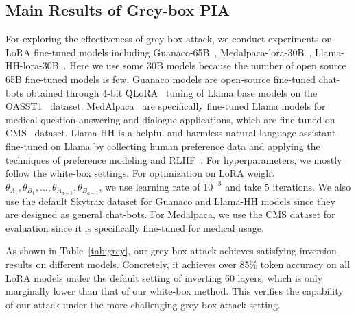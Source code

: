 \subsection{Main Results of Grey-box PIA}
\begin{table}[t]
\centering
{}
\caption{Results for grey-box inversion attacks on three LoRA models on Skytrax~\cite{skytrax} dataset.}
\vspace{-2em}
\label{tab:grey}
\end{table}

For exploring the effectiveness of grey-box attack, we conduct experiments on LoRA fine-tuned models including Guanaco-65B~\cite{guanaco}, Medalpaca-lora-30B~\cite{medalpaca}, Llama-HH-lora-30B~\cite{HH}. Here we use some 30B models because the number of open source 65B fine-tuned models is few.  Guanaco models are open-source fine-tuned chat-bots obtained through 4-bit QLoRA~\cite{guanaco} tuning of Llama base models on the OASST1~\cite{oasst1} dataset. MedAlpaca~\cite{medalpaca} are specifically fine-tuned Llama models for medical question-answering and dialogue applications, which are fine-tuned on CMS~\cite{cms} dataset.  Llama-HH is a helpful and harmless natural language assistant fine-tuned on Llama by collecting human preference data and applying the techniques of preference modeling
 and RLHF~\cite{rlhf}. For hyperparameters, we mostly follow the white-box  settings.  For optimization on LoRA weight $\theta_{A_1},\theta_{B_1},\ldots, \theta_{A_{a-1}},\theta_{B_{a-1}}$, we use learning rate of  $10^{-3}$ and take 5 iterations. We also use the default Skytrax dataset for Guanaco and Llama-HH models since they are designed as general chat-bots. For Medalpaca, we use the CMS dataset for evaluation since it is specifically fine-tuned for medical usage.

As shown in Table~\ref{tab:grey}, our grey-box attack achieves satisfying inversion results on different models. Concretely, it achieves over 85\%  token accuracy on all LoRA models under the default setting of inverting 60 layers, which is only marginally lower than that of our white-box method. This verifies the capability of our attack under the more challenging grey-box attack setting.

